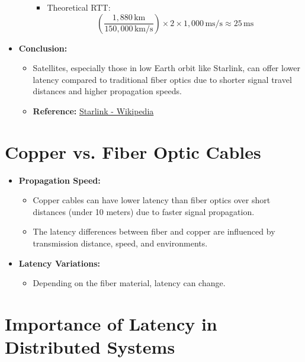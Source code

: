\documentclass[../Main.tex]{subfiles}
\begin{document}
\begin{itemize}
\begin{itemize}
\begin{itemize}
            \item Theoretical RTT:
            \[
            \left(\frac{1,880\,\text{km}}{150,000\,\text{km/s}}\right) \times 2 \times 1,000\,\text{ms/s} \approx 25\,\text{ms}
            \]
        \end{itemize}
    \end{itemize}
    \item \textbf{Conclusion:}
    \begin{itemize}
        \item Satellites, especially those in low Earth orbit like Starlink, can offer lower latency compared to traditional fiber optics due to shorter signal travel distances and higher propagation speeds.
        \item \textbf{Reference:} \href{https://en.wikipedia.org/wiki/Starlink}{Starlink - Wikipedia}
    \end{itemize}
\end{itemize}

\section*{Copper vs. Fiber Optic Cables}

\begin{itemize}
    \item \textbf{Propagation Speed:}
    \begin{itemize}
        \item Copper cables can have lower latency than fiber optics over short distances (under 10 meters)
        due to faster signal propagation.
        \item The latency differences between fiber and copper are influenced by transmission distance,
        speed, and environments.
    \end{itemize}
    \item \textbf{Latency Variations:}
    \begin{itemize}
        \item Depending on the fiber material, latency can change.
    \end{itemize}
\end{itemize}

\section*{Importance of Latency in Distributed Systems}
\end{document}
